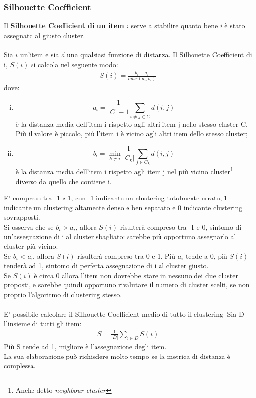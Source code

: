 \subsubsection{Silhouette Coefficient}
Il \textbf{Silhouette Coefficient di un item $i$} serve a stabilire quanto bene $i$ è stato assegnato al giusto cluster.\\
\\
Sia $i$ un'item e sia $d$ una qualsiasi funzione di distanza. Il Silhouette Coefficient di i, $S(i)$ si calcola nel seguente modo:
\begin{align}
S(i) = \frac{b_i - a_i}{max(a_i, b_i)}
\end{align}
dove:
\begin{enumerate}[(i)]
	\item $$ a_i = \frac{1}{|C|-1}\sum_{i\ne j\in C} d(i,j)$$ è la distanza media dell'item i rispetto agli altri item j nello stesso cluster C.\\
	Più il valore è piccolo, più l'item i è vicino agli altri item dello stesso cluster;
	\item $$ b_i = \min_{k\ne i} \frac{1}{|C_k|}\sum_{j \in C_k} d(i,j)$$ è la distanza media dell'item i rispetto agli item j nel più vicino cluster\footnote{Anche detto \textit{neighbour cluster}} diverso da quello che contiene i.
\end{enumerate}
E' compreso tra -1 e 1, con -1 indicante un clustering totalmente errato, 1 indicante un clustering altamente denso e ben separato e 0 indicante clustering sovrapposti.\\
Si osserva che se $b_i > a_i$, allora $S(i)$ risulterà compreso tra -1 e 0, sintomo di un'assegnazione di i al cluster sbagliato: sarebbe più opportuno assegnarlo al cluster più vicino.\\
Se $b_i < a_i$, allora $S(i)$ risulterà compreso tra 0 e 1. Più $a_i$ tende a 0, più $S(i)$ tenderà ad 1, sintomo di perfetta assegnazione di i al cluster giusto.\\
Se $S(i)$ è circa 0 allora l'item non dovrebbe stare in nessuno dei due cluster proposti, e sarebbe quindi opportuno rivalutare il numero di cluster scelti, se non proprio l'algoritmo di clustering stesso.\\
\\
E' possibile calcolare il Silhouette Coefficient medio di tutto il clustering. Sia D l'insieme di tutti gli item:
\begin{align}
S = \frac{1}{|D|} \sum_{i \in D} S(i)
\end{align}
Più S tende ad 1, migliore è l'assegnazione degli item.\\
La sua elaborazione può richiedere molto tempo se la metrica di distanza è complessa.


